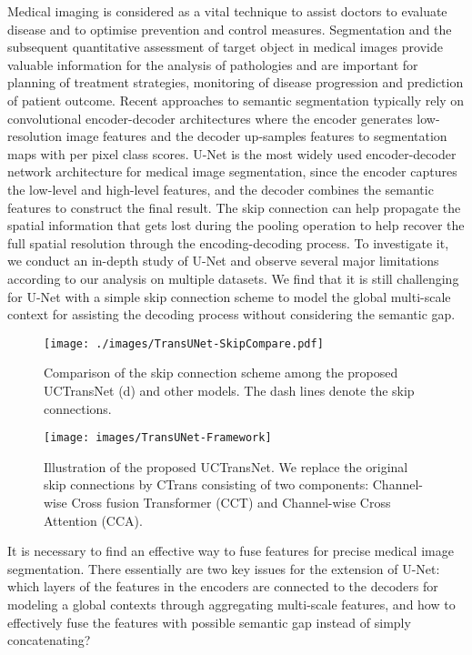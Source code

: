 \documentclass[letterpaper]{article} \usepackage{aaai22}  \usepackage{times}  \usepackage{helvet}  \usepackage{courier}  \usepackage[hyphens]{url}  \usepackage{graphicx} \urlstyle{rm} \def\UrlFont{\rm}  \usepackage{natbib}  \usepackage{caption} \DeclareCaptionStyle{ruled}{labelfont=normalfont,labelsep=colon,strut=off} \frenchspacing  \setlength{\pdfpagewidth}{8.5in}  \setlength{\pdfpageheight}{11in}  \usepackage{algorithm}
\begin{document}
	Medical imaging is considered as a vital technique to assist doctors to evaluate disease and to optimise prevention and control measures. Segmentation and the subsequent quantitative assessment of target object in medical images provide valuable information for the analysis of pathologies and are important for planning of treatment strategies, monitoring of disease progression and prediction of patient outcome.
	Recent approaches \cite{FullyConvolutionalNetworks_2015,PyramidAttentionAggregation_2020,SegmentingMedicalMRI_2020} to semantic segmentation typically rely on convolutional encoder-decoder architectures where the encoder generates low-resolution image features and the decoder up-samples features to segmentation maps with per pixel class scores.
	U-Net \cite{UNetConvolutionalNetworks_2015} is the most widely used encoder-decoder network architecture for medical image segmentation, since the encoder captures the low-level and high-level features, and the decoder combines the semantic features to construct the final result. 
	The skip connection can help propagate the spatial information that gets lost during the pooling operation to help recover the full spatial resolution through the encoding-decoding process.
To investigate it, we conduct an in-depth study of U-Net and observe several major limitations according to our analysis on multiple datasets. We find that it is still challenging for U-Net with a simple skip connection scheme to model the global multi-scale context for assisting the decoding process without considering the semantic gap. 
	\begin{figure}[t]
		\centering
		\texttt{[image: ./images/TransUNet-SkipCompare.pdf]} \caption{Comparison of the skip connection scheme among the proposed UCTransNet (d) and other models. The dash lines denote the skip connections.}
		\label{SkipCompare}
	\end{figure}
	\begin{figure*}[!ht]
		\centering
		\texttt{[image: images/TransUNet-Framework]} \caption{Illustration of the proposed UCTransNet. We replace the original skip connections by CTrans consisting of two  components: Channel-wise Cross fusion Transformer (CCT) and Channel-wise Cross Attention (CCA).}
		\label{Framework}
	\end{figure*}
	It is necessary to find an effective way to fuse features for precise medical image segmentation.
	There essentially are two key issues for the extension of U-Net: which layers of the features in the encoders are connected to the decoders for modeling a global contexts through aggregating multi-scale features, and how to effectively fuse the features with possible semantic gap instead of simply concatenating?
\end{document}

